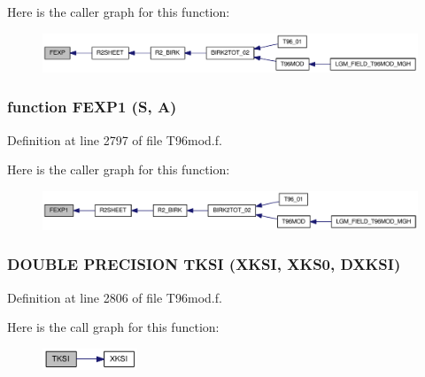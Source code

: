 Here is the caller graph for this function:\nopagebreak
\begin{figure}[H]
\begin{center}
\leavevmode
\includegraphics[width=332pt]{_t96mod_8f_de7e8858bac24c4e9ef3bbee7949e235_icgraph}
\end{center}
\end{figure}
\hypertarget{_t96mod_8f_4652a5d7098ea16cd1f49a0597effa56}{
\subsubsection[{FEXP1}]{\setlength{\rightskip}{0pt plus 5cm}function FEXP1 (S, \/  A)}}
\label{_t96mod_8f_4652a5d7098ea16cd1f49a0597effa56}




Definition at line 2797 of file T96mod.f.

Here is the caller graph for this function:\nopagebreak
\begin{figure}[H]
\begin{center}
\leavevmode
\includegraphics[width=335pt]{_t96mod_8f_4652a5d7098ea16cd1f49a0597effa56_icgraph}
\end{center}
\end{figure}
\hypertarget{_t96mod_8f_2b6a113bedd0458c72d9e0723c3bb7d4}{
\subsubsection[{TKSI}]{\setlength{\rightskip}{0pt plus 5cm}DOUBLE PRECISION TKSI (XKSI, \/  XKS0, \/  DXKSI)}}
\label{_t96mod_8f_2b6a113bedd0458c72d9e0723c3bb7d4}




Definition at line 2806 of file T96mod.f.

Here is the call graph for this function:\nopagebreak
\begin{figure}[H]
\begin{center}
\leavevmode
\includegraphics[width=80pt]{_t96mod_8f_2b6a113bedd0458c72d9e0723c3bb7d4_cgraph}
\end{center}
\end{figure}


